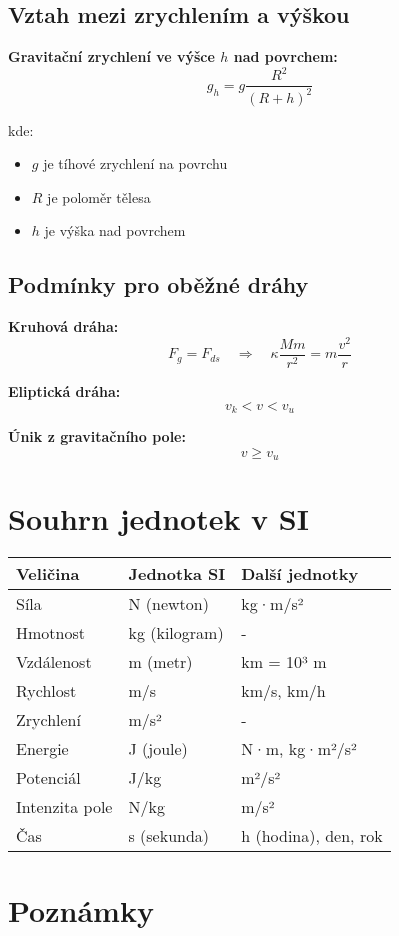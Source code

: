 \documentclass[11pt,a4paper]{article}
\begin{document}
\subsection{Vztah mezi zrychlením a výškou}

\textbf{Gravitační zrychlení ve výšce $h$ nad povrchem:}
\[g_h = g \frac{R^2}{(R+h)^2}\]

kde:
\begin{itemize}
\item $g$ je tíhové zrychlení na povrchu
\item $R$ je poloměr tělesa
\item $h$ je výška nad povrchem
\end{itemize}

\subsection{Podmínky pro oběžné dráhy}

\textbf{Kruhová dráha:}
\[F_g = F_{ds} \quad \Rightarrow \quad \kappa \frac{Mm}{r^2} = m\frac{v^2}{r}\]

\textbf{Eliptická dráha:}
\[v_k < v < v_u\]

\textbf{Únik z gravitačního pole:}
\[v \geq v_u\]

\clearpage

\section{Souhrn jednotek v SI}

\begin{longtable}{lll}
\toprule
Veličina & Jednotka SI & Další jednotky \\
\midrule
Síla & N (newton) & kg·m/s² \\
Hmotnost & kg (kilogram) & - \\
Vzdálenost & m (metr) & km = 10³ m \\
Rychlost & m/s & km/s, km/h \\
Zrychlení & m/s² & - \\
Energie & J (joule) & N·m, kg·m²/s² \\
Potenciál & J/kg & m²/s² \\
Intenzita pole & N/kg & m/s² \\
Čas & s (sekunda) & h (hodina), den, rok \\
\bottomrule
\end{longtable}

\clearpage

\section*{Poznámky}
\end{document}
